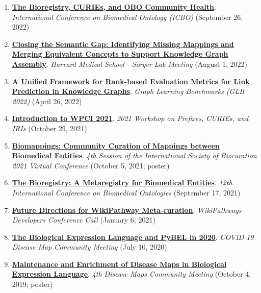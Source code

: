 \documentclass[10pt,a4paper,sans]{moderncv} %
\begin{document}
\begin{enumerate}
    \item \textbf{\href{https://bit.ly/icbo2022-cth}{The Bioregistry, CURIEs, and OBO Community Health}}. \textit{International Conference on Biomedical Ontology (ICBO)} (September 26, 2022)

    \item \textbf{\href{https://bit.ly/sorger-lab-biomappings}{Closing the Semantic Gap: Identifying Missing Mappings and Merging Equivalent Concepts to Support Knowledge Graph Assembly}}. \textit{Harvard Medical School - Sorger Lab Meeting} (August 1, 2022)

    \item \textbf{\href{https://bit.ly/glb2022-ranking-metrics}{A Unified Framework for Rank-based Evaluation Metrics for Link Prediction in Knowledge Graphs}}. \textit{Graph Learning Benchmarks (GLB 2022)} (April 26, 2022)

    \item \textbf{\href{https://bit.ly/WPCI2021}{Introduction to WPCI 2021}}. \textit{2021 Workshop on Prefixes, CURIEs, and IRIs} (October 29, 2021)

    \item \textbf{\href{https://f1000research.com/posters/10-1005}{Biomappings: Community Curation of Mappings between Biomedical Entities}}. \textit{4th Session of the International Society of Biocuration 2021 Virtual Conference} (October 5, 2021; poster)

    \item \textbf{\href{https://www.youtube.com/watch?v=9Pf5wr8JxCQ&t=1s}{The Bioregistry: A Metaregistry for Biomedical Entities}}. \textit{12th International Conference on Biomedical Ontologies} (September 17, 2021)

    \item \textbf{\href{https://docs.google.com/presentation/d/1C8T3XVOL8GiZ68WBXXSnI3SVjhd2aSBuVLXVPPGqKTw/edit?usp=sharing}{Future Directions for WikiPathway Meta-curation}}. \textit{WikiPathways Developers Conference Call} (January 6, 2021)

    \item \textbf{\href{https://docs.google.com/presentation/d/18ntRMvO3Q9KTX87xoLOIgqAW3iiUvxJsfEmaFh1-52A/edit?usp=sharing}{The Biological Expression Language and PyBEL in 2020}}. \textit{COVID-19 Disease Map Community Meeting} (July 10, 2020)

    \item \textbf{\href{https://doi.org/10.6084/m9.figshare.9917753.v3}{Maintenance and Enrichment of Disease Maps in Biological Expression Language}}. \textit{4th Disease Maps Community Meeting} (October 4, 2019; poster)


\end{enumerate}
\end{document}
